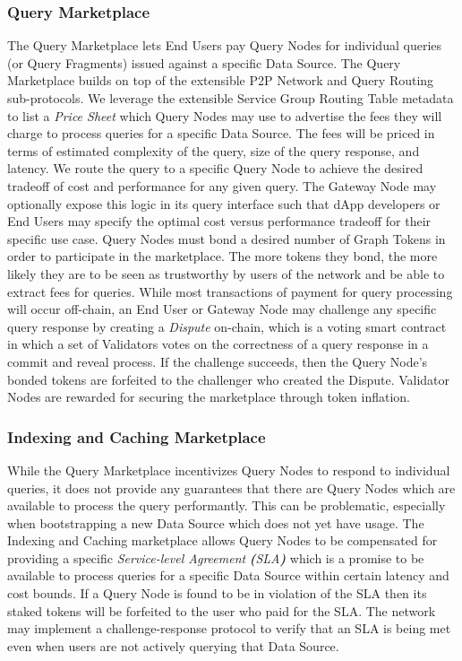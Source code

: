 \documentclass[12pt]{article}
\begin{document}
\subsubsection*{Query Marketplace}
The Query Marketplace lets End Users pay Query Nodes for individual queries (or Query Fragments) issued against a specific Data Source. The Query Marketplace builds on top of the extensible P2P Network and Query Routing sub-protocols. We leverage the extensible Service Group Routing Table metadata to list a \textit{Price Sheet} which Query Nodes may use to advertise the fees they will charge to process queries for a specific Data Source. The fees will be priced in terms of estimated complexity of the query, size of the query response, and latency. We route the query to a specific Query Node to achieve the desired tradeoff of cost and performance for any given query. The Gateway Node may optionally expose this logic in its query interface such that dApp developers or End Users may specify the optimal cost versus performance tradeoff for their specific use case.
\newline
\newline
Query Nodes must bond a desired number of Graph Tokens in order to participate in the marketplace. The more tokens they bond, the more likely they are to be seen as trustworthy by users of the network and be able to extract fees for queries. While most transactions of payment for query processing will occur off-chain, an End User or Gateway Node may challenge any specific query response by creating a \textit{Dispute} on-chain, which is a voting smart contract in which a set of Validators votes on the correctness of a query response in a commit and reveal process. If the challenge succeeds, then the Query Node's bonded tokens are forfeited to the challenger who created the Dispute. Validator Nodes are rewarded for securing the marketplace through token inflation.
\subsubsection*{Indexing and Caching Marketplace}
While the Query Marketplace incentivizes Query Nodes to respond to individual queries, it does not provide any guarantees that there are Query Nodes which are available to process the query performantly. This can be problematic, especially when bootstrapping a new Data Source which does not yet have usage. The Indexing and Caching marketplace allows Query Nodes to be compensated for providing a specific \textit{Service-level Agreement} \textbf{\textit{(}}\textit{SLA}\textbf{\textit{)}} which is a promise to be available to process queries for a specific Data Source within certain latency and cost bounds. If a Query Node is found to be in violation of the SLA then its staked tokens will be forfeited to the user who paid for the SLA. The network may implement a challenge-response protocol to verify that an SLA is being met even when users are not actively querying that Data Source.
\end{document}
